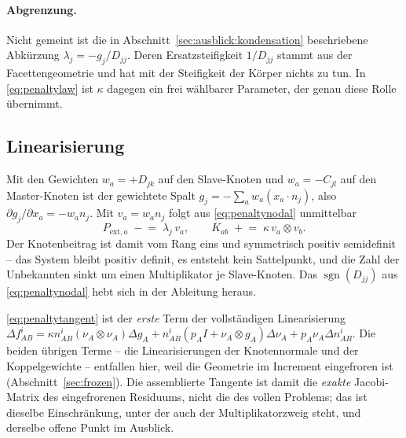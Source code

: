 \documentclass[a4paper,11pt]{article}
\def\bm#1{#1}%
\def\tilde#1{#1}%
\begin{document}
\paragraph{Abgrenzung.} Nicht gemeint ist die in Abschnitt~\ref{sec:ausblick:kondensation}
beschriebene Abkürzung $\lambda_j=-\tilde g_j/\tilde D_{jj}$. Deren Ersatzsteifigkeit
$1/\tilde D_{jj}$ stammt aus der Facettengeometrie und hat mit der Steifigkeit der Körper nichts
zu tun. In \eqref{eq:penaltylaw} ist $\kappa$ dagegen ein frei wählbarer Parameter, der genau
diese Rolle übernimmt.

\subsection{Linearisierung}
\label{sec:penaltytangent}

Mit den Gewichten $w_a=+D_{jk}$ auf den Slave-Knoten und $w_a=-C_{jl}$ auf den Master-Knoten ist
der gewichtete Spalt $\tilde g_j=-\sum_a w_a(\bm x_a\!\cdot\!\bm n_j)$, also
$\partial\tilde g_j/\partial\bm x_a=-w_a\bm n_j$. Mit $\bm v_a=w_a\bm n_j$ folgt aus
\eqref{eq:penaltynodal} unmittelbar
\begin{equation}
\bm P_{\text{ext},a} \;\mathrel{-}=\; \lambda_j\,\bm v_a ,
\qquad
\bm K_{ab} \;\mathrel{+}=\; \kappa\,\bm v_a\otimes\bm v_b .
\label{eq:penaltytangent}
\end{equation}
Der Knotenbeitrag ist damit vom Rang eins und symmetrisch positiv semidefinit -- das System bleibt
positiv definit, es entsteht kein Sattelpunkt, und die Zahl der Unbekannten sinkt um einen
Multiplikator je Slave-Knoten. Das $\operatorname{sgn}(\tilde D_{jj})$ aus
\eqref{eq:penaltynodal} hebt sich in der Ableitung heraus.

\eqref{eq:penaltytangent} ist der \emph{erste} Term der vollständigen Linearisierung
\citep[Gl.~(25)]{puso2004}
$\Delta\bm f^i_{AB}=\kappa n^i_{AB}(\bm\nu_A\otimes\bm\nu_A)\Delta\bm g_A
+n^i_{AB}(p_A\bm I+\bm\nu_A\otimes\bm g_A)\Delta\bm\nu_A+p_A\bm\nu_A\Delta n^i_{AB}$.
Die beiden übrigen Terme -- die Linearisierungen der Knotennormale und der Koppelgewichte --
entfallen hier, weil die Geometrie im Increment eingefroren ist
(Abschnitt~\ref{sec:frozen}). Die assemblierte Tangente ist damit die \emph{exakte} Jacobi-Matrix
des eingefrorenen Residuums, nicht die des vollen Problems; das ist dieselbe Einschränkung, unter
der auch der Multiplikatorzweig steht, und derselbe offene Punkt im Ausblick.

\end{document}
